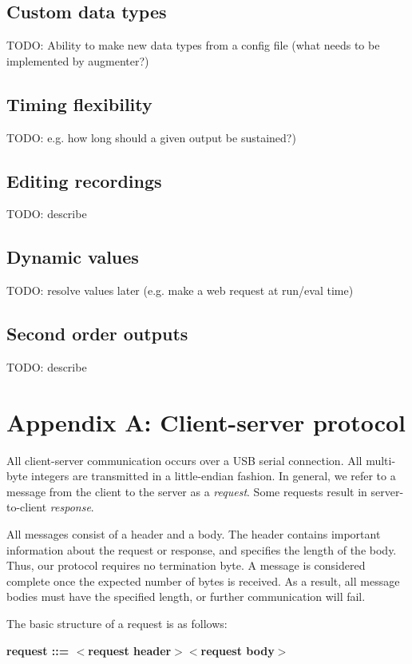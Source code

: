 \documentclass[12pt]{article}
\begin{document}
\subsection{Custom data types}
TODO: Ability to make new data types from a config file (what needs to be implemented by augmenter?)


\subsection{Timing flexibility}
TODO: e.g. how long should a given output be sustained?)

\subsection{Editing recordings}
TODO: describe

\subsection{Dynamic values}
TODO: resolve values later (e.g. make a web request at run/eval time)

\subsection{Second order outputs}
TODO: describe

\newpage

\section{Appendix A: Client-server protocol}
\label{sec:protocol}
All client-server communication occurs over a USB serial connection.  All multi-byte integers are transmitted in a little-endian fashion.  In general, we refer to a message from the client to the server as a \textit{request}.  Some requests result in server-to-client \textit{response}.

All messages consist of a header and a body.  The header contains important information about the request or response, and specifies the length of the body. Thus, our protocol requires no termination byte.  A message is considered complete once the expected number of bytes is received.  As a result, all message bodies must have the specified length, or further communication will fail.

The basic structure of a request is as follows:

\textbf{request ::= $<$request header$>$$<$request body$>$}
\end{document}
